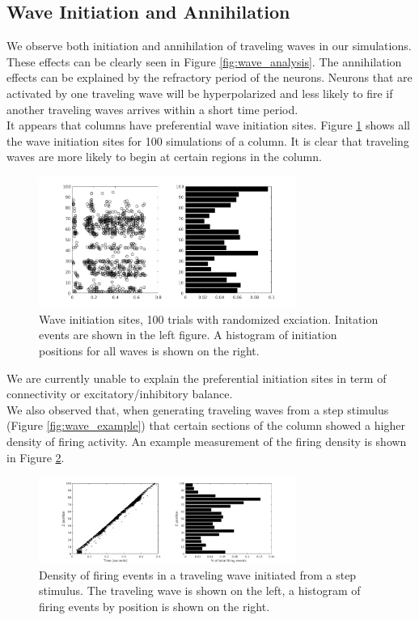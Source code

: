\documentclass[a4paper,11pt]{article}
\begin{document}
\subsection{Wave Initiation and Annihilation}
We observe both initiation and annihilation of traveling waves in our simulations.
These effects can be clearly seen in Figure \ref{fig:wave_analysis}.
The annihilation effects can be explained by the refractory period of the neurons.
Neurons that are activated by one traveling wave will be hyperpolarized and less likely to fire if another traveling waves arrives within a short time period.
\\
It appears that columns have preferential wave initiation sites.
Figure \ref{fig:wave_initiation} shows all the wave initiation sites for 100 simulations of a column.
It is clear that traveling waves are more likely to begin at certain regions in the column.
\begin{figure}[!htb]
 \caption{Wave initiation sites, 100 trials with randomized exciation. Initation events are shown in the left figure. A histogram of initiation positions for all waves is shown on the right.}
 \label{fig:wave_initiation}
 \centering
   \includegraphics[width=0.75\textwidth]{fig/InitiationSites_100sims}
\end{figure}
We are currently unable to explain the preferential initiation sites in term of connectivity or excitatory/inhibitory balance. 
\\
We also observed that, when generating traveling waves from a step stimulus (Figure \ref{fig:wave_example}) that certain sections of the column showed a higher density of firing activity.
An example measurement of the firing density is shown in Figure \ref{fig:wave_density}.
\begin{figure}[!htb]
 \caption{Density of firing events in a traveling wave initiated from a step stimulus. The traveling wave is shown on the left, a histogram of firing events by position is shown on the right.}
 \label{fig:wave_density}
 \centering
   \includegraphics[width=0.75\textwidth]{fig/ImpulseWaveDensity}
\end{figure}
\end{document}
